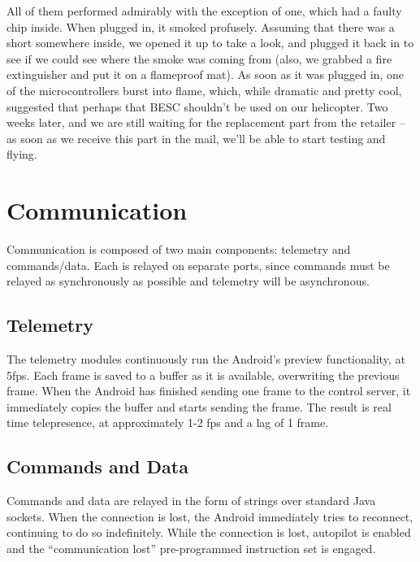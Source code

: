 All of them performed admirably with the exception of one, which had a
faulty chip inside. When plugged in, it smoked profusely. Assuming
that there was a short somewhere inside, we opened it up to take a
look, and plugged it back in to see if we could see where the smoke
was coming from (also, we grabbed a fire extinguisher and put it on a
flameproof mat). As soon as it was plugged in, one of the
microcontrollers burst into flame, which, while dramatic and pretty
cool, suggested that perhaps that BESC shouldn't be used on our
helicopter. Two weeks later, and we are still waiting for the
replacement part from the retailer -- as soon as we receive this part
in the mail, we'll be able to start testing and flying.

\section{Communication}
Communication is composed of two main components:‭ ‬telemetry and
commands/data.‭ ‬Each is relayed on separate ports,‭ ‬since commands must
be relayed as synchronously as possible and telemetry will be
asynchronous.

\subsection{Telemetry}
The telemetry modules continuously run the Android's preview
functionality,‭ ‬at‭ ‬5fps.‭  ‬Each frame is saved to a buffer as it is
available,‭ ‬overwriting the previous frame.‭  ‬When the Android has
finished sending one frame to the control server,‭ ‬it immediately
copies the buffer and starts sending the frame.‭  ‬The result is real
time telepresence,‭ ‬at approximately‭ ‬1-2‭ ‬fps and a lag of‭ ‬1‭ ‬frame.

\subsection{Commands and Data}
Commands and data are relayed in the form of strings over standard
Java sockets.‭ ‬When the connection is lost,‭ ‬the Android immediately
tries to reconnect,‭ ‬continuing to do so indefinitely.‭ ‬While the
connection is lost,‭ ‬autopilot is enabled and the‭ “‬communication lost‭”
‬pre-programmed instruction set is engaged.

